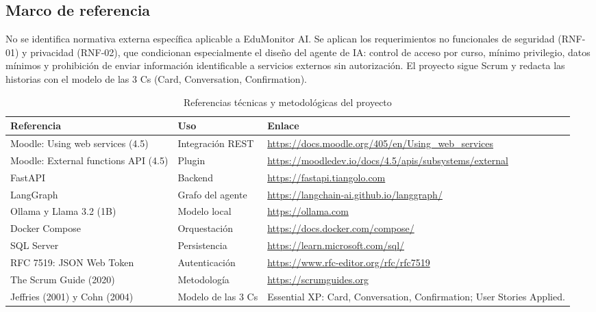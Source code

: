 \documentclass[11pt,a4paper]{article}
\newcommand{\hd}[1]{\textbf{#1}}
\begin{document}
\subsection{Marco de referencia}
No se identifica normativa externa específica aplicable a EduMonitor AI. Se aplican los requerimientos no funcionales de seguridad (RNF-01) y privacidad (RNF-02), que condicionan especialmente el diseño del agente de IA: control de acceso por curso, mínimo privilegio, datos mínimos y prohibición de enviar información identificable a servicios externos sin autorización. El proyecto sigue Scrum y redacta las historias con el modelo de las 3 Cs (Card, Conversation, Confirmation).

\begin{table}[H]
\centering\small
\caption{Referencias técnicas y metodológicas del proyecto}
\begin{tabularx}{\textwidth}{|R{4.0cm}|R{3.2cm}|Y|}
\hline
\hd{Referencia} & \hd{Uso} & \hd{Enlace}\\ \hline
Moodle: Using web services (4.5) & Integración REST & \url{https://docs.moodle.org/405/en/Using_web_services}\\ \hline
Moodle: External functions API (4.5) & Plugin  & \url{https://moodledev.io/docs/4.5/apis/subsystems/external}\\ \hline
FastAPI & Backend & \url{https://fastapi.tiangolo.com}\\ \hline
LangGraph & Grafo del agente & \url{https://langchain-ai.github.io/langgraph/}\\ \hline
Ollama y Llama 3.2 (1B) & Modelo local & \url{https://ollama.com}\\ \hline
Docker Compose & Orquestación & \url{https://docs.docker.com/compose/}\\ \hline
SQL Server & Persistencia & \url{https://learn.microsoft.com/sql/}\\ \hline
RFC 7519: JSON Web Token & Autenticación & \url{https://www.rfc-editor.org/rfc/rfc7519}\\ \hline
The Scrum Guide (2020) & Metodología & \url{https://scrumguides.org}\\ \hline
Jeffries (2001) y Cohn (2004) & Modelo de las 3 Cs & Essential XP: Card, Conversation, Confirmation; User Stories Applied.\\ \hline
\end{tabularx}
\end{table}

\end{document}
